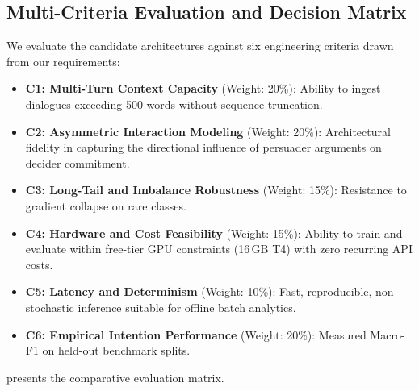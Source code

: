 \subsection{Multi-Criteria Evaluation and Decision Matrix}
We evaluate the candidate architectures against six engineering criteria drawn from our requirements:
\begin{itemize}
  \item \textbf{C1: Multi-Turn Context Capacity} (Weight: 20\%): Ability to ingest dialogues exceeding 500 words without sequence truncation.
  \item \textbf{C2: Asymmetric Interaction Modeling} (Weight: 20\%): Architectural fidelity in capturing the directional influence of persuader arguments on decider commitment.
  \item \textbf{C3: Long-Tail and Imbalance Robustness} (Weight: 15\%): Resistance to gradient collapse on rare classes.
  \item \textbf{C4: Hardware and Cost Feasibility} (Weight: 15\%): Ability to train and evaluate within free-tier GPU constraints (16\,GB T4) with zero recurring API costs.
  \item \textbf{C5: Latency and Determinism} (Weight: 10\%): Fast, reproducible, non-stochastic inference suitable for offline batch analytics.
  \item \textbf{C6: Empirical Intention Performance} (Weight: 20\%): Measured Macro-F1 on held-out benchmark splits.
\end{itemize}

 presents the comparative evaluation matrix.

